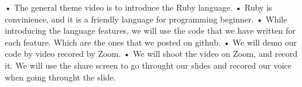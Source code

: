 • The general theme video is to introduce the Ruby language.
• Ruby is convinience,  and it is a friendly language for programming beginner.
• While introducing the language features, we will use the code that we have written for each feature. Which are the ones that we posted on github. 
• We will demo our code by video recored by Zoom.
• We will shoot the video on Zoom, and record it. We will use the share screen to go throught our slides and recored our voice when going throught the slide.
